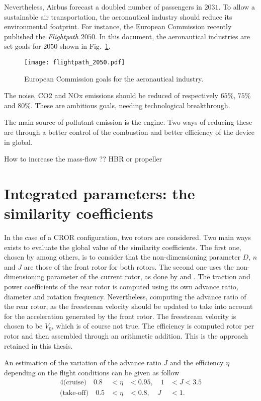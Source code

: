 Nevertheless, Airbus forecast a doubled number of passengers in
$2031$. To allow a sustainable air transportation, the aeronautical
industry should reduce its environmental footprint. For instance,
the European Commission recently published the \emph{Flightpath $2050$}.
In this document, the aeronautical industries are set goals for $2050$
shown in Fig.~\ref{fig:flightpath_2050}.
\begin{figure}[htbp]
  \centering
  \texttt{[image: flightpath\_2050.pdf]}
  \caption{European Commission goals for the aeronautical industry. }
  \label{fig:flightpath_2050}
\end{figure}
The noise, CO2 and NOx emissions should be reduced of 
respectively $65\%$, $75\%$ and $80\%$.
These are ambitious goals, needing technological breakthrough.

The main source of pollutant emission is the engine. Two ways of reducing
these are through a better control of the combustion and better
efficiency of the device in global.

How to increase the mass-flow ??
HBR or propeller

\section{Integrated parameters: the similarity coefficients}
\label{sec:ca_similarity_coeff}

In the case of a CROR configuration, two rotors are considered.
Two main ways exists to evaluate the global value of the
similarity coefficients. The first one, chosen by
\citet{Bechet2011} among others, is to consider
that the non-dimensioning parameter $D$, $n$ and $J$ are those
of the front rotor for both rotors. 
The second one uses the non-dimensioning parameter of the current rotor,
as done by \citet{Stuermer2008} and \citet{Zachariadis2011}.
The traction and power coefficients of the rear rotor is
computed using its own advance ratio, diameter and rotation frequency.
Nevertheless, computing the advance ratio of the rear rotor, as
the freestream velocity should be updated to take into account
for the acceleration generated by the front rotor. The freestream
velocity is chosen to be $V_0$, which is of course not true.
The efficiency is computed rotor per rotor and then
assembled through an arithmetic addition. This is the approach retained
in this thesis.

An estimation of the variation of the advance ratio $J$ and the 
efficiency $\eta$ depending on the flight conditions can be given as follow
\begin{alignat}{4}
    \text{(cruise)} \quad  0.8 &< \eta &< 0.95, \quad 1 &< J < 3.5 \\
    \text{(take-off)} \quad  0.5 &< \eta &< 0.8, \quad J &< 1.
\end{alignat}

